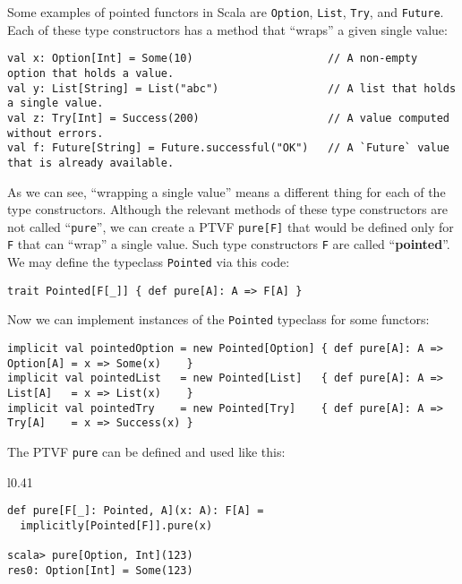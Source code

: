 Some examples of pointed functors in Scala are \lstinline!Option!,
\lstinline!List!, \lstinline!Try!, and \lstinline!Future!. Each
of these type constructors has a method that \textsf{``}wraps\textsf{''} a given single
value:
\begin{lstlisting}
val x: Option[Int] = Some(10)                     // A non-empty option that holds a value.
val y: List[String] = List("abc")                 // A list that holds a single value.
val z: Try[Int] = Success(200)                    // A value computed without errors.
val f: Future[String] = Future.successful("OK")   // A `Future` value that is already available.
\end{lstlisting}
As we can see, \textsf{``}wrapping a single value\textsf{''} means a different thing
for each of the type constructors. Although the relevant methods of
these type constructors are not called \textsf{``}\lstinline!pure!\textsf{''}, we
can create a PTVF \lstinline!pure[F]! that would be defined only
for \lstinline!F! that can \textsf{``}wrap\textsf{''} a single value. Such type constructors
\lstinline!F! are called \textsf{``}\textbf{pointed}\textsf{''}. We may define the
typeclass \lstinline!Pointed!
via this code:
\begin{lstlisting}
trait Pointed[F[_]] { def pure[A]: A => F[A] }
\end{lstlisting}
Now we can implement instances of the \lstinline!Pointed! typeclass
for some functors:
\begin{lstlisting}
implicit val pointedOption = new Pointed[Option] { def pure[A]: A => Option[A] = x => Some(x)    }
implicit val pointedList   = new Pointed[List]   { def pure[A]: A => List[A]   = x => List(x)    }
implicit val pointedTry    = new Pointed[Try]    { def pure[A]: A => Try[A]    = x => Success(x) }
\end{lstlisting}
The PTVF \lstinline!pure! can be defined and used like this:

\begin{wrapfigure}{l}{0.41\columnwidth}%
\vspace{-0.95\baselineskip}
\begin{lstlisting}
def pure[F[_]: Pointed, A](x: A): F[A] =
  implicitly[Pointed[F]].pure(x)

scala> pure[Option, Int](123)
res0: Option[Int] = Some(123)
\end{lstlisting}
\vspace{-0.95\baselineskip}
\end{wrapfigure}%

